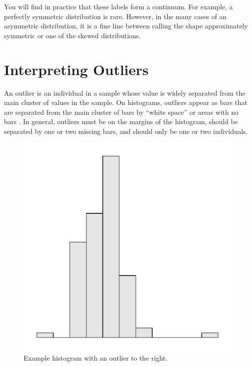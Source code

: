 \documentclass[10pt,openany]{book}\usepackage[]{graphicx}\usepackage[]{color}
\newenvironment{knitrout}{}{} %
\begin{document}
You will find in practice that these labels form a continuum.  For example, a perfectly symmetric distribution is rare.  However, in the many cases of an asymmetric distribution, it is a fine line between calling the shape approximately symmetric or one of the skewed distributions.



\section{Interpreting Outliers}
An outlier is an individual in a sample whose value is widely separated from the main cluster of values in the sample.  On histograms, outliers appear as bars that are separated from the main cluster of bars by ``white space'' or areas with no bars .  In general, outliers must be on the margins of the histogram, should be separated by one or two missing bars, and should only be one or two individuals.

\begin{knitrout}
\color{fgcolor}\begin{figure}[hbtp]

{\centering \includegraphics[width=.4\linewidth]{Figs/OutlierExHist-1} 

}

\caption[Example histogram with an outlier to the right]{Example histogram with an outlier to the right.}\label{fig:OutlierExHist}
\end{figure}


\end{knitrout}

\end{document}
